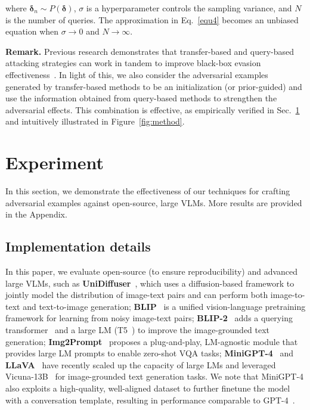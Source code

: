where $\boldsymbol{\delta}_{n}\sim P(\boldsymbol{\delta})$, $\sigma$ is a hyperparameter controls the sampling variance, and $N$ is the number of queries. The approximation in Eq.~\eqref{equ4} becomes an unbiased equation when $\sigma\rightarrow 0$ and $N\rightarrow \infty$.

\textbf{Remark.} Previous research demonstrates that transfer-based and query-based attacking strategies can work in tandem to improve black-box evasion effectiveness~\citep{cheng2019improving,dong2021query}. In light of this, we also consider the adversarial examples generated by transfer-based methods to be an initialization (or prior-guided) and use the information obtained from query-based methods to strengthen the adversarial effects. This combination is effective, as empirically verified in Sec.~\ref{sec:experiment} and intuitively illustrated in Figure~\ref{fig:method}.

\section{Experiment}
\label{sec:experiment}
In this section, we demonstrate the effectiveness of our techniques for crafting adversarial examples against open-source, large VLMs. More results are provided in the Appendix.

\subsection{Implementation details}

In this paper, we evaluate open-source (to ensure reproducibility) and advanced large VLMs, such as \textbf{UniDiffuser}~\citep{bao2022one}, which uses a diffusion-based framework to jointly model the distribution of image-text pairs and can perform both image-to-text and text-to-image generation; \textbf{BLIP}~\citep{li2022blip} is a unified vision-language pretraining framework for learning from noisy image-text pairs; \textbf{BLIP-2}~\citep{li2023blip} adds a querying transformer~\citep{vaswani2017attention} and a large LM (T5~\citep{raffel2020exploring}) to improve the image-grounded text generation; \textbf{Img2Prompt}~\citep{guoimages} proposes a plug-and-play, LM-agnostic module that provides large LM prompts to enable zero-shot VQA tasks; \textbf{MiniGPT-4}~\citep{zhu2023minigpt} and \textbf{LLaVA}~\citep{liu2023llava} have recently scaled up the capacity of large LMs and leveraged Vicuna-13B~\citep{chiang2023vicuna} for image-grounded text generation tasks. We note that MiniGPT-4 also exploits a high-quality, well-aligned dataset to further finetune the model with a conversation template, resulting in performance comparable to GPT-4~\citep{gpt4}.

